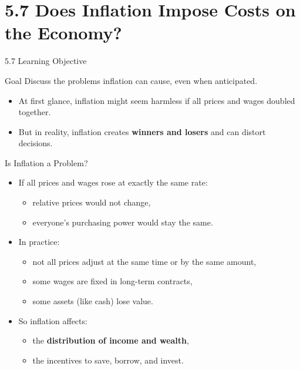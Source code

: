 \documentclass[aspectratio=169]{beamer}
\begin{document}
\section{5.7 Does Inflation Impose Costs on the Economy?}

\begin{frame}{5.7 Learning Objective}
\transfade
\begin{block}{Goal}
Discuss the problems inflation can cause, even when anticipated.
\end{block}
\begin{itemize}[<+->]
  \item At first glance, inflation might seem harmless if all prices and wages doubled together.
  \item But in reality, inflation creates \textbf{winners and losers} and can distort decisions.
\end{itemize}
\end{frame}

\begin{frame}{Is Inflation a Problem?}
\transfade
\begin{itemize}[<+->]
  \item If all prices and wages rose at exactly the same rate:
  \begin{itemize}[<+->]
    \item relative prices would not change,
    \item everyone’s purchasing power would stay the same.
  \end{itemize}
  \item In practice:
  \begin{itemize}[<+->]
    \item not all prices adjust at the same time or by the same amount,
    \item some wages are fixed in long-term contracts,
    \item some assets (like cash) lose value.
  \end{itemize}
  \item So inflation affects:
  \begin{itemize}[<+->]
    \item the \textbf{distribution of income and wealth},
    \item the incentives to save, borrow, and invest.
  \end{itemize}
\end{itemize}
\end{frame}
\end{document}
